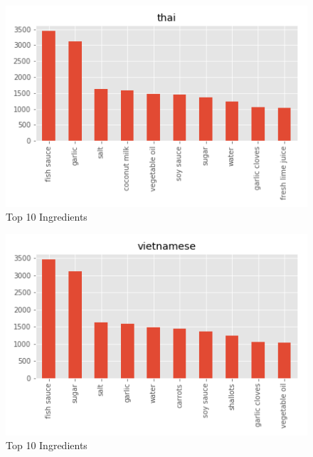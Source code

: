\documentclass[sigconf]{acmart}
\begin{document}
\begin{figure}[!ht]
  \centering\includegraphics[width=\columnwidth]{images/thai_10_most_used_ingredients.png}
  \caption{Top 10 Ingredients }\label{f:thai_10_most_used_ingredients}
\end{figure}

\begin{figure}[!ht]
  \centering\includegraphics[width=\columnwidth]{images/vietnamese_10_most_used_ingredients.png}
  \caption{Top 10 Ingredients }\label{f:vietnamese_10_most_used_ingredients}
\end{figure}
\end{document}
